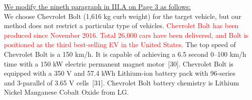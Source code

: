 \documentclass[onecolumn]{IEEEconf}
\begin{document}
\begin{description}
\uline{We modify the nineth paragraph in III.A on Page 3 as follows:}\\
We choose Chevrolet Bolt (1,616 kg curb weight) for the target vehicle, but our method does not restrict a particular type of vehicles. \textcolor{red}{Chevrolet Bolt has been produced since November 2016. Total 26,000 cars have been  delivered, and Bolt is positioned as the third best-selling EV in the United States.} The top speed of Chevrolet Bolt is a 150 km/h. It is capable of achieving a 6.5 second 0--100 km/h time with a 150 kW electric permanent magnet motor~[30]. Chevrolet Bolt is equipped with a 350 V and 57.4 kWh Lithium-ion battery pack with 96-series and 3-parallel of 3.65 V cells~[31]. Chevrolet Bolt battery chemistry is Lithium Nickel Manganese Cobalt Oxide from LG. 

\end{description}
\end{document}
